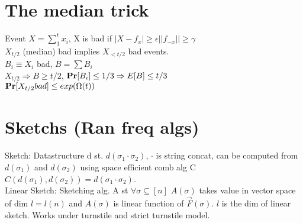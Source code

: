 \documentclass[a4paper]{article}
\def\Pr{\mbox{\textbf{Pr}}}
\begin{document}
\section{The median trick}
Event \(X=\sum_1^t x_i\), X is bad if \(|X-f_x| \geq \epsilon |\!|f_{-x}|\!| \geq \gamma\)\\
\(X_{t/2}\) (median) bad implies \(X_{<t/2}\) bad events.\\
\(B_i \equiv X_i\) bad, \(B = \sum B_i\)\\
\(X_{t/2} \Rightarrow B \geq t/2\), \(\Pr[B_i] \leq 1/3 \Rightarrow E[B] \leq t/3\)\\
\(\Pr[X_{t/2} bad] \leq exp(\Omega(t))\)
\section{Sketchs (Ran freq algs)}
Sketch: Datastructure d st. \(d(\sigma_1 \cdot \sigma_2)\), \(\cdot\) is string concat, can be computed from \(d(\sigma_1)\) and \(d(\sigma_2)\) using space efficient comb alg C \(C(d(\sigma_1),d(\sigma_2)) = d(\sigma_1 \cdot \sigma_2)\).\\
Linear Sketch: Sketching alg. A st \(\forall \sigma \subseteq [n]\) \(A(\sigma)\) takes value in vector space of dim \(l=l(n)\) and \(A(\sigma)\) is linear function of \(\vec{F}(\sigma)\). \(l\) is the dim of linear sketch. Works under turnstile and strict turnstile model.\\
\end{document}
